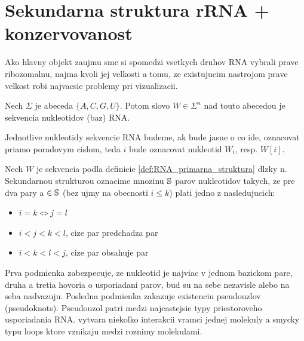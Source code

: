 \section{Sekundarna struktura rRNA + konzervovanost}

Ako hlavny objekt zaujmu sme si spomedzi vsetkych druhov RNA vybrali prave ribozomalnu,
najma kvoli jej velkosti a tomu, ze existujucim nastrojom prave velkost robi najvacsie problemy
pri vizualizacii.

\begin{definice}
  \label{def:RNA_primarna_struktura}
  Nech $\Sigma$ je abeceda $\{A, C, G, U\}$. Potom slovo $W \in \Sigma^n$ nad touto abecedou
  je sekvencia nukleotidov (baz) RNA.
\end{definice}

Jednotlive nukleotidy sekvencie RNA budeme, ak bude jasne o co ide, oznacovat priamo poradovym
cislom, teda $i$ bude oznacovat nukleotid $W_{i}$, resp. $W[i]$.

\begin{definice}
  \label{def:RNA_sekundarna_struktura}
  Nech $W$ je sekvencia podla definicie \ref{def:RNA_primarna_struktura} dlzky n.
  Sekundarnou strukturou oznacime mnozinu $\mathbb{S}$ parov nukleotidov  takych, ze
  pre dva pary  a  $\in \mathbb{S}$ (bez ujmy na obecnosti $i \leq k$)
  plati jedno z nasledujucich:
  \begin{itemize}
    \item $i = k \iff j = l$
    \item $i < j < k < l$, cize par  predchadza par 
    \item $i < k < l < j$, cize par  obsahuje par 
  \end{itemize}
\end{definice}


Prva podmienka zabezpecuje, ze nukleotid je najviac v jednom bazickom pare, druha a tretia
hovoria o usporiadani parov, bud su na sebe nezavisle alebo na seba nadvazuju.
Posledna podmienka zakazuje existenciu pseudouzlov (pseudoknots). Pseudouzol patri medzi najcastejsie typy priestoroveho usporiadania RNA. vytvara  niekolko interakcii vramci jednej molekuly a smycky typu loops  ktore vznikaju medzi roznimy molekulami.


